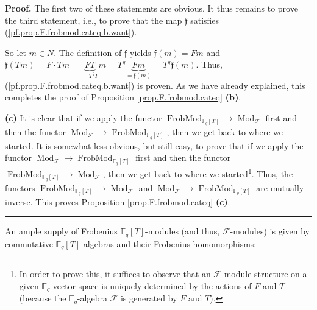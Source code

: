 \documentclass[numbers=enddot,12pt,final,onecolumn,notitlepage]{scrartcl}%
\theoremstyle{definition}
\newenvironment{proof}[1][Proof]{\noindent\textbf{#1.} }{\ \rule{0.5em}{0.5em}}
\begin{document}
\begin{proof}
The first two of these statements are obvious. It thus remains to prove the
third statement, i.e., to prove that the map $\mathfrak{f}$ satisfies
(\ref{pf.prop.F.frobmod.cateq.b.want}).

So let $m\in N$. The definition of $\mathfrak{f}$ yields $\mathfrak{f}\left(
m\right)  =Fm$ and $\mathfrak{f}\left(  Tm\right)  =F\cdot Tm=\underbrace{FT}%
_{=T^{q}F}m=T^{q}\underbrace{Fm}_{=\mathfrak{f}\left(  m\right)  }%
=T^{q}\mathfrak{f}\left(  m\right)  $. Thus,
(\ref{pf.prop.F.frobmod.cateq.b.want}) is proven. As we have already
explained, this completes the proof of Proposition \ref{prop.F.frobmod.cateq}
\textbf{(b)}. \medskip

\textbf{(c)} It is clear that if we apply the functor $\operatorname*{FrobMod}%
\nolimits_{\mathbb{F}_{q}\left[  T\right]  }\rightarrow\operatorname*{Mod}%
\nolimits_{\mathcal{F}}$ first and then the functor $\operatorname*{Mod}%
\nolimits_{\mathcal{F}}\rightarrow\operatorname*{FrobMod}\nolimits_{\mathbb{F}%
_{q}\left[  T\right]  }$, then we get back to where we started. It is somewhat
less obvious, but still easy, to prove that if we apply the functor
$\operatorname*{Mod}\nolimits_{\mathcal{F}}\rightarrow\operatorname*{FrobMod}%
\nolimits_{\mathbb{F}_{q}\left[  T\right]  }$ first and then the functor
$\operatorname*{FrobMod}\nolimits_{\mathbb{F}_{q}\left[  T\right]
}\rightarrow\operatorname*{Mod}\nolimits_{\mathcal{F}}$, then we get back to
where we started\footnote{In order to prove this, it suffices to observe that
an $\mathcal{F}$-module structure on a given $\mathbb{F}_{q}$-vector space is
uniquely determined by the actions of $F$ and $T$ (because the $\mathbb{F}%
_{q}$-algebra $\mathcal{F}$ is generated by $F$ and $T$).}. Thus, the functors
$\operatorname*{FrobMod}\nolimits_{\mathbb{F}_{q}\left[  T\right]
}\rightarrow\operatorname*{Mod}\nolimits_{\mathcal{F}}$ and
$\operatorname*{Mod}\nolimits_{\mathcal{F}}\rightarrow\operatorname*{FrobMod}%
\nolimits_{\mathbb{F}_{q}\left[  T\right]  }$ are mutually inverse. This
proves Proposition \ref{prop.F.frobmod.cateq} \textbf{(c)}.
\end{proof}

An ample supply of Frobenius $\mathbb{F}_{q}\left[  T\right]  $-modules (and
thus, $\mathcal{F}$-modules) is given by commutative $\mathbb{F}_{q}\left[
T\right]  $-algebras and their Frobenius homomorphisms:
\end{document}
